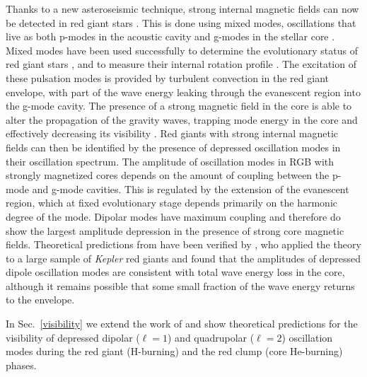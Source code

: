 Thanks to a new asteroseismic technique, strong internal magnetic fields can now be detected in red giant stars \citep{Fuller_2015}. This is done using mixed modes, oscillations that live as both p-modes in the acoustic cavity and g-modes in the stellar core \cite{Dupret_2009}. Mixed modes have been used successfully  to determine the evolutionary status of red giant stars \citep{Bedding_2011}, and to measure their internal rotation profile \citep{Beck_2011}.  
The excitation of these pulsation modes is provided by turbulent convection in the red giant envelope, with part of the wave energy leaking through the evanescent region into the g-mode cavity. The presence of a strong magnetic field in the core is able to alter the propagation of the gravity waves, trapping  mode energy in the core and effectively decreasing its visibility \citep[magnetic greenhouse effect,][]{Fuller_2015}. Red giants with strong internal magnetic fields can then be identified by the presence of depressed oscillation modes in their oscillation spectrum. The amplitude of oscillation modes in RGB with strongly magnetized cores depends on the amount of coupling between the p-mode and g-mode cavities. This is regulated by the extension of the evanescent region, which at fixed evolutionary stage depends primarily on the harmonic degree of the mode. Dipolar modes have maximum coupling and therefore do show the largest amplitude depression in the presence of strong core magnetic fields. Theoretical predictions from \citet{Fuller_2015} have been verified by \citet{Stello_2016}, who applied the theory to a large sample of {\it Kepler} red giants and found that the amplitudes of depressed dipole oscillation modes are consistent with total wave energy loss in the core, although it remains possible that some small fraction of the wave energy returns to the envelope.

In Sec.~\ref{visibility} we extend the work of \citet{Fuller_2015} and show theoretical predictions for the visibility of depressed dipolar ($\ell=1$) and quadrupolar ($\ell=2$) oscillation modes during the red giant  (H-burning) and  the red clump (core He-burning) phases. 




  